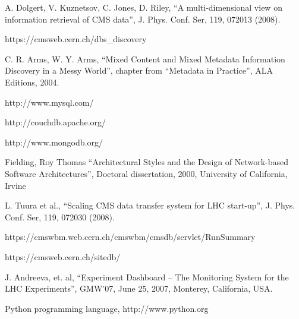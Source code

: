\documentclass[1p,times]{elsarticle}
\begin{document}
\begin{thebibliography}{00}
A. Dolgert, V. Kuznetsov, C. Jones, D. Riley, 
``A multi-dimensional view on information retrieval of CMS data'',
J. Phys. Conf. Ser, 119, 072013 (2008).

 https://cmsweb.cern.ch/dbs\_discovery

C. R. Arms, W. Y. Arms,
 ``Mixed Content and Mixed Metadata 
Information Discovery in a Messy World'',
chapter from ``Metadata in Practice'', ALA Editions, 2004.

http://www.mysql.com/

http://couchdb.apache.org/

http://www.mongodb.org/

Fielding, Roy Thomas ``Architectural Styles and the Design of 
Network-based Software Architectures'', Doctoral dissertation, 2000,
University of California, Irvine

L. Tuura et al., 
``Scaling CMS data transfer system for LHC start-up'', 
J. Phys. Conf. Ser, 119, 072030 (2008).

https://cmswbm.web.cern.ch/cmswbm/cmsdb/servlet/RunSummary

https://cmsweb.cern.ch/sitedb/




J. Andreeva, et. al,
``Experiment Dashboard – The Monitoring System for the LHC Experiments'',
GMW’07, June 25, 2007, Monterey, California, USA.


 Python programming language, http://www.python.org

\end{thebibliography}
\end{document}
